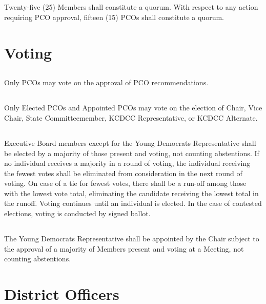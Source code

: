 \subsection{}
Twenty-five (25) Members shall constitute a quorum. With respect to any action requiring PCO approval, fifteen (15) PCOs shall constitute a quorum.

\section{Voting}
\subsection{}
Only PCOs may vote on the approval of PCO recommendations.

\subsection{}
Only Elected PCOs and Appointed PCOs may vote on the election of Chair, Vice Chair, State Committeemember, KCDCC Representative, or KCDCC Alternate.

\subsection{}
Executive Board members except for the Young Democrats Representative shall be elected by a majority of those present and voting, not counting abstentions. If no individual receives a majority in a round of voting, the individual receiving the fewest votes shall be eliminated from consideration in the next round of voting. On case of a tie for fewest votes, there shall be a run-off among those with the lowest vote total, eliminating the candidate receiving the lowest total in the runoff.  Voting continues until an individual is elected. In the case of contested elections, voting is conducted by signed ballot.

\subsection{}
The Young Democrats Representative shall be appointed by the Chair subject to the approval of a majority of Members present and voting at a Meeting, not counting abstentions.

\section{District Officers}
\label{officers}
